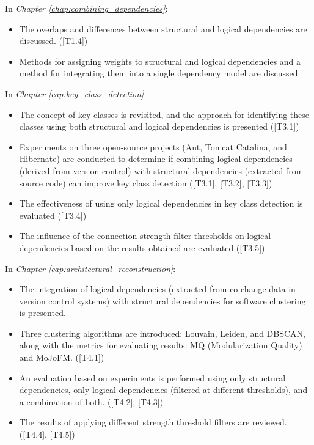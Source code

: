 \noindent In \textit{Chapter \ref{chap:combining_dependencies}}:
\begin{itemize}
    \item The overlaps and differences between structural and logical dependencies are discussed. \hfill ([T1.4])
    \item Methods for assigning weights to structural and logical dependencies and a method for integrating them into a single dependency model are discussed.
\end{itemize}

\noindent In \textit{Chapter \ref{cap:key_class_detection}}:
\begin{itemize}
    \item The concept of key classes is revisited, and the approach for identifying these classes using both structural and logical dependencies is presented \hfill ([T3.1])
    \item Experiments on three open-source projects (Ant, Tomcat Catalina, and Hibernate) are conducted to determine if combining logical dependencies (derived from version control) with structural dependencies (extracted from source code) can improve key class detection \hfill ([T3.1], [T3.2], [T3.3])
    \item The effectiveness of using only logical dependencies in key class detection is evaluated \hfill ([T3.4])
    \item The influence of the connection strength filter thresholds on logical dependencies based on the results obtained are evaluated \hfill ([T3.5])
\end{itemize}


\noindent In \textit{Chapter \ref{cap:architectural_reconstruction}}:
\begin{itemize}
    \item The integration of logical dependencies (extracted from co-change data in version control systems) with structural dependencies for software clustering is presented. 
    \item Three clustering algorithms are introduced: Louvain, Leiden, and DBSCAN, along with the metrics for evaluating results: MQ (Modularization Quality) and MoJoFM. \hfill ([T4.1])
    \item An evaluation based on experiments is performed using only structural dependencies, only logical dependencies (filtered at different thresholds), and a combination of both. \hfill ([T4.2], [T4.3])
    \item The results of applying different strength threshold filters are reviewed. \hfill ([T4.4], [T4.5])
\end{itemize}


